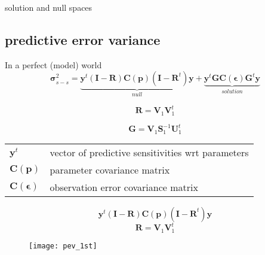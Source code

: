 \documentclass{beamer}
\begin{document}
\begin{frame}{solution and null spaces}
\begin{figure}
\end{figure}
\end{frame}

\subsection{predictive error variance}

\begin{frame}{In a perfect (model) world}
\begin{equation*}
\boldsymbol{\sigma}^{2}_{\hat{s} - s} = 
\underset{null} {\underbrace{ 
\mathbf{y}^{t} (\mathbf{I - R})\mathbf{C}(\textbf{p}) (\mathbf{I - R}^{t})\mathbf{y} } } + 
\underset{solution} {\underbrace{ \mathbf{y}^{t} \mathbf{GC}(\boldsymbol{\epsilon})\mathbf{G}^{t} \mathbf{y} } }
\end{equation*}

\begin{equation*}
\textbf{R} = \textbf{V}_1\textbf{V}^t_1
\end{equation*}

\begin{equation*}
\textbf{G} = \textbf{V}_1\textbf{S}^{-1}_1\textbf{U}^t_1
\end{equation*}

\begin{tabular}{ll}
{$\textbf{y}^t$}&vector of predictive sensitivities wrt parameters\\
{$\textbf{C}(\textbf{p})$}& parameter covariance matrix\\
{$\textbf{C}(\boldsymbol{\epsilon})$}&observation error covariance matrix\\
\end{tabular} 
\end{frame}

\begin{frame}
\begin{equation*}
\mathbf{y}^{t} (\mathbf{I - R})\mathbf{C}(\textbf{p}) (\mathbf{I - R}^{t})\mathbf{y}
\end{equation*}
\begin{equation*}
\textbf{R} = \textbf{V}_1\textbf{V}^t_1
\end{equation*}

\begin{figure}
\vspace{-0.25cm} \texttt{[image: pev\_1st]}
\end{figure}
\end{frame}
\end{document}
